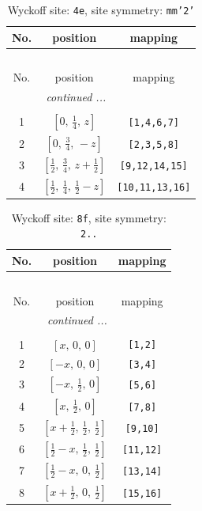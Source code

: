 \documentclass[fleqn,8pt]{jsarticle}
\begin{document}
\renewcommand{\arraystretch}{1.2}
\begin{longtable}{ccc}
\caption{Wyckoff site: {\tt 4e}, site symmetry: {\tt mm'2'}}
 \\
 \hline \hline
No. & position & mapping \\ \hline \endfirsthead

\multicolumn{2}{l}{\tablename\ \thetable{}} \\
 \hline \hline
No. & position & mapping \\ \hline \endhead

 \hline \hline
\multicolumn{2}{r}{\footnotesize\it continued ...} \\ \endfoot

 \hline \hline
\multicolumn{2}{r}{} \\ \endlastfoot

1 & $\left[ 0,\, \frac{1}{4},\, z \right]$ & {\tt [1,4,6,7]} \\ \hline
2 & $\left[ 0,\, \frac{3}{4},\, - z \right]$ & {\tt [2,3,5,8]} \\ \hline
3 & $\left[ \frac{1}{2},\, \frac{3}{4},\, z + \frac{1}{2} \right]$ & {\tt [9,12,14,15]} \\ \hline
4 & $\left[ \frac{1}{2},\, \frac{1}{4},\, \frac{1}{2} - z \right]$ & {\tt [10,11,13,16]} \\
\end{longtable}
\renewcommand{\arraystretch}{1.2}
\begin{longtable}{ccc}
\caption{Wyckoff site: {\tt 8f}, site symmetry: {\tt 2..}}
 \\
 \hline \hline
No. & position & mapping \\ \hline \endfirsthead

\multicolumn{2}{l}{\tablename\ \thetable{}} \\
 \hline \hline
No. & position & mapping \\ \hline \endhead

 \hline \hline
\multicolumn{2}{r}{\footnotesize\it continued ...} \\ \endfoot

 \hline \hline
\multicolumn{2}{r}{} \\ \endlastfoot

1 & $\left[ x,\, 0,\, 0 \right]$ & {\tt [1,2]} \\ \hline
2 & $\left[ - x,\, 0,\, 0 \right]$ & {\tt [3,4]} \\ \hline
3 & $\left[ - x,\, \frac{1}{2},\, 0 \right]$ & {\tt [5,6]} \\ \hline
4 & $\left[ x,\, \frac{1}{2},\, 0 \right]$ & {\tt [7,8]} \\ \hline
5 & $\left[ x + \frac{1}{2},\, \frac{1}{2},\, \frac{1}{2} \right]$ & {\tt [9,10]} \\ \hline
6 & $\left[ \frac{1}{2} - x,\, \frac{1}{2},\, \frac{1}{2} \right]$ & {\tt [11,12]} \\ \hline
7 & $\left[ \frac{1}{2} - x,\, 0,\, \frac{1}{2} \right]$ & {\tt [13,14]} \\ \hline
8 & $\left[ x + \frac{1}{2},\, 0,\, \frac{1}{2} \right]$ & {\tt [15,16]} \\
\end{longtable}
\end{document}
